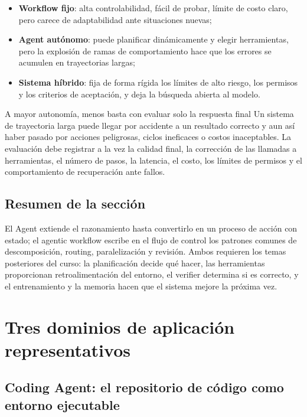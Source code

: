 \documentclass[a4paper]{article}
\begin{document}
\begin{itemize}
    \item \textbf{Workflow fijo}: alta controlabilidad, fácil de probar, límite de costo claro, pero carece de adaptabilidad ante situaciones nuevas;
    \item \textbf{Agent autónomo}: puede planificar dinámicamente y elegir herramientas, pero la explosión de ramas de comportamiento hace que los errores se acumulen en trayectorias largas;
    \item \textbf{Sistema híbrido}: fija de forma rígida los límites de alto riesgo, los permisos y los criterios de aceptación, y deja la búsqueda abierta al modelo.
\end{itemize}

\begin{warningbox}{A mayor autonomía, menos basta con evaluar solo la respuesta final}
Un sistema de trayectoria larga puede llegar por accidente a un resultado correcto y aun así haber pasado por acciones peligrosas, ciclos ineficaces o costos inaceptables. La evaluación debe registrar a la vez la calidad final, la corrección de las llamadas a herramientas, el número de pasos, la latencia, el costo, los límites de permisos y el comportamiento de recuperación ante fallos.
\end{warningbox}

\subsection{Resumen de la sección}

El Agent extiende el razonamiento hasta convertirlo en un proceso de acción con estado; el agentic workflow escribe en el flujo de control los patrones comunes de descomposición, routing, paralelización y revisión. Ambos requieren los temas posteriores del curso: la planificación decide qué hacer, las herramientas proporcionan retroalimentación del entorno, el verifier determina si es correcto, y el entrenamiento y la memoria hacen que el sistema mejore la próxima vez.
\section{Tres dominios de aplicación representativos}

\subsection{Coding Agent: el repositorio de código como entorno ejecutable}
\end{document}
